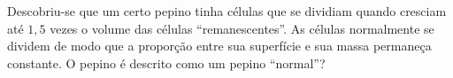 Descobriu-se que um certo pepino tinha células que se dividiam quando cresciam até $1,5$ vezes o volume das células ``remanescentes''. As células normalmente se dividem de modo que a proporção entre sua superfície e sua massa permaneça constante. O pepino é descrito como um pepino ``normal''?

